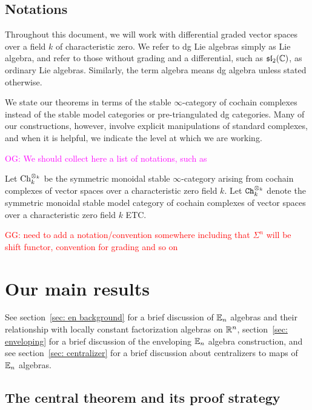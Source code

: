 \documentclass[11pt]{amsart}
\numberwithin{equation}{section}
\def\owen{\textcolor{magenta}{OG: }\textcolor{magenta}}
\def\greg{\textcolor{red}{GG: }\textcolor{red}}
\begin{document}
\subsection{Notations}

\begin{rmk}
Throughout this document, we will work with differential graded vector spaces over a field $k$ of characteristic zero. We refer to dg Lie algebras simply as Lie algebra, and refer to those without grading and a differential, such as $\frak{sl}_2(\mathbb C)$, as ordinary Lie algebras. Similarly, the term algebra means dg algebra unless stated otherwise.
\end{rmk}

\begin{rmk}
We state our theorems in terms of the stable $\infty$-category of cochain complexes 
instead of the stable model categories or pre-triangulated dg categories. 
Many of our constructions, however, involve explicit manipulations of standard complexes, 
and when it is helpful, we indicate the level at which we are working.
\end{rmk}

\owen{We should collect here a list of notations, such as}

Let ${\rm Ch}_k^{\otimes_k}$ be the symmetric monoidal stable $\infty$-category arising from cochain complexes of vector spaces over a characteristic zero field $k$.
Let ${\tt Ch}_k^{\otimes_k}$ denote the symmetric monoidal stable model category of cochain complexes of vector spaces over a characteristic zero field $k$ ETC.

\greg{need to add a notation/convention somewhere including that $\Sigma^n$ will be shift functor, convention for grading and so on}

\section{Our main results}

See section~\ref{sec: en background} for a brief discussion of $\mathbb E_n$ algebras and their relationship with locally constant factorization algebras on $\mathbb R^n$, section~\ref{sec: enveloping} for a brief discussion of the enveloping $\mathbb E_n$ algebra construction, and see section~\ref{sec: centralizer} 
for a brief discussion about centralizers to maps of $\mathbb E_n$ algebras.

\subsection{The central theorem and its proof strategy}
\end{document}
